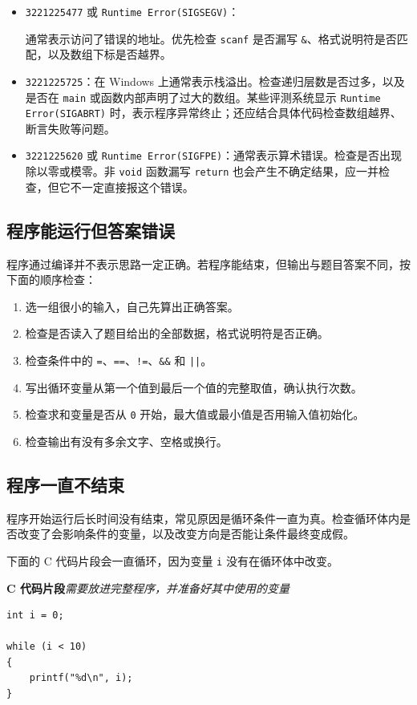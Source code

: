 \documentclass[UTF8,zihao=-4,fontset=windows]{ctexart}
\newcommand{\cfragmentlabel}{\noindent\textbf{C 代码片段}\quad\textit{需要放进完整程序，并准备好其中使用的变量}\par\nopagebreak}
\begin{document}
\begin{itemize}
  \item \texttt{3221225477} 或 \texttt{Runtime Error(SIGSEGV)}：\par
  通常表示访问了错误的地址。优先检查 \verb|scanf| 是否漏写 \verb|&|、格式说明符是否匹配，以及数组下标是否越界。
  \item \texttt{3221225725}：在 Windows 上通常表示栈溢出。检查递归层数是否过多，以及是否在 \verb|main| 或函数内部声明了过大的数组。某些评测系统显示 \texttt{Runtime Error(SIGABRT)} 时，表示程序异常终止；还应结合具体代码检查数组越界、断言失败等问题。
  \item \texttt{3221225620} 或 \texttt{Runtime Error(SIGFPE)}：通常表示算术错误。检查是否出现除以零或模零。非 \verb|void| 函数漏写 \verb|return| 也会产生不确定结果，应一并检查，但它不一定直接报这个错误。
\end{itemize}

\subsection{程序能运行但答案错误}

程序通过编译并不表示思路一定正确。若程序能结束，但输出与题目答案不同，按下面的顺序检查：
\begin{enumerate}
  \item 选一组很小的输入，自己先算出正确答案。
  \item 检查是否读入了题目给出的全部数据，格式说明符是否正确。
  \item 检查条件中的 \verb|=|、\verb|==|、\verb|!=|、\verb|&&| 和 \verb+||+。
  \item 写出循环变量从第一个值到最后一个值的完整取值，确认执行次数。
  \item 检查求和变量是否从 \verb|0| 开始，最大值或最小值是否用输入值初始化。
  \item 检查输出有没有多余文字、空格或换行。
\end{enumerate}

\subsection{程序一直不结束}

程序开始运行后长时间没有结束，常见原因是循环条件一直为真。检查循环体内是否改变了会影响条件的变量，以及改变方向是否能让条件最终变成假。

下面的 C 代码片段会一直循环，因为变量 \verb|i| 没有在循环体中改变。

\cfragmentlabel
\begin{lstlisting}[style=cstyle]
int i = 0;

while (i < 10)
{
    printf("%d\n", i);
}
\end{lstlisting}
\end{document}
